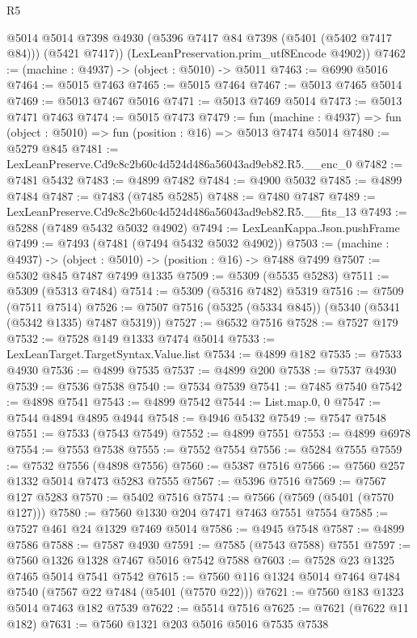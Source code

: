\begin{lexlean}{R5}
\begin{coremodule}
        @5014
        @5014
        @7398
        @4930
        (@5396 @7417 @84 @7398 (@5401 (@5402 @7417 @84)))
        (@5421 @7417))
      (LexLeanPreservation.prim_utf8Encode @4902))
@7462 := (machine : @4937) -> (object : @5010) -> @5011
@7463 := @6990 @5016
@7464 := @5015 @7463
@7465 := @5015 @7464
@7467 := @5013 @7465 @5014
@7469 := @5013 @7467 @5016
@7471 := @5013 @7469 @5014
@7473 := @5013 @7471 @7463
@7474 := @5015 @7473
@7479 := fun (machine : @4937) => fun (object : @5010) => fun (position : @16) => @5013 @7474 @5014
@7480 := @5279 @845
@7481 := LexLeanPreserve.Cd9c8c2b60c4d524d486a56043ad9eb82.R5.__enc_0
@7482 := @7481 @5432
@7483 := @4899 @7482
@7484 := @4900 @5032
@7485 := @4899 @7484
@7487 := @7483 (@7485 @5285)
@7488 := @7480 @7487
@7489 := LexLeanPreserve.Cd9c8c2b60c4d524d486a56043ad9eb82.R5.__fits_13
@7493 := @5288 (@7489 @5432 @5032 @4902)
@7494 := LexLeanKappa.Json.pushFrame
@7499 := @7493 (@7481 (@7494 @5432 @5032 @4902))
@7503 := (machine : @4937) -> (object : @5010) -> (position : @16) -> @7488 @7499
@7507 := @5302 @845 @7487 @7499 @1335
@7509 := @5309 (@5535 @5283)
@7511 := @5309 (@5313 @7484)
@7514 := @5309 (@5316 @7482) @5319
@7516 := @7509 (@7511 @7514)
@7526 := @7507 @7516 (@5325 (@5334 @845)) (@5340 (@5341 (@5342 @1335) @7487 @5319))
@7527 := @6532 @7516
@7528 := @7527 @179
@7532 := @7528 @149 @1333 @7474 @5014
@7533 := LexLeanTarget.TargetSyntax.Value.list
@7534 := @4899 @182
@7535 := @7533 @4930
@7536 := @4899 @7535
@7537 := @4899 @200
@7538 := @7537 @4930
@7539 := @7536 @7538
@7540 := @7534 @7539
@7541 := @7485 @7540
@7542 := @4898 @7541
@7543 := @4899 @7542
@7544 := List.map.{0, 0}
@7547 := @7544 @4894 @4895 @4944
@7548 := @4946 @5432
@7549 := @7547 @7548
@7551 := @7533 (@7543 @7549)
@7552 := @4899 @7551
@7553 := @4899 @6978
@7554 := @7553 @7538
@7555 := @7552 @7554
@7556 := @5284 @7555
@7559 := @7532 @7556 (@4898 @7556)
@7560 := @5387 @7516
@7566 := @7560 @257 @1332 @5014 @7473 @5283 @7555
@7567 := @5396 @7516
@7569 := @7567 @127 @5283
@7570 := @5402 @7516
@7574 := @7566 (@7569 (@5401 (@7570 @127)))
@7580 := @7560 @1330 @204 @7471 @7463 @7551 @7554
@7585 := @7527 @461 @24 @1329 @7469 @5014
@7586 := @4945 @7548
@7587 := @4899 @7586
@7588 := @7587 @4930
@7591 := @7585 (@7543 @7588) @7551
@7597 := @7560 @1326 @1328 @7467 @5016 @7542 @7588
@7603 := @7528 @23 @1325 @7465 @5014 @7541 @7542
@7615 := @7560 @116 @1324 @5014 @7464 @7484 @7540 (@7567 @22 @7484 (@5401 (@7570 @22)))
@7621 := @7560 @183 @1323 @5014 @7463 @182 @7539
@7622 := @5514 @7516
@7625 := @7621 (@7622 @11 @182)
@7631 := @7560 @1321 @203 @5016 @5016 @7535 @7538

\end{coremodule}
\end{lexlean}
